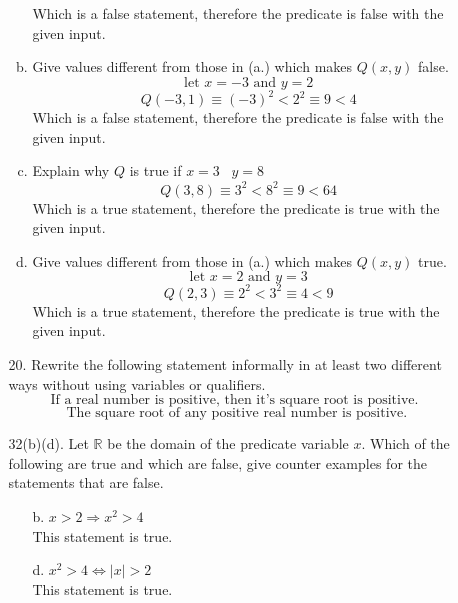 \documentclass[12pt]{article}
\newcommand{\R}{\mathbb{R}}
\newcommand{\paren}[1]{\left( #1 \right)}
\newcommand{\abso}[1]{\left|#1 \right|}
\begin{document}
\begin{enumerate}
\begin{enumerate}
\begin{enumerate}[a.]
                            Which is a false statement, therefore the predicate is false with the given input. 
                        \item Give values different from those in (a.) which makes $Q(x,y)$ false.
                            \[
                            \text{let $x=-3$ and $y=2$}
                            \]
                            \[
                            Q(-3,1) \equiv \paren{-3}^2 < 2^2 \equiv 9 < 4
                            \]
                            Which is a false statement, therefore the predicate is false with the given input. 
                        \item Explain why $Q$ is true if $x=3 \;\;\; y=8$
                            \[
                            Q(3,8) \equiv 3^2 < 8^2 \equiv 9 < 64
                            \]
                            Which is a true statement, therefore the predicate is true with the given input.
                        \item Give values different from those in (a.) which makes $Q(x,y)$ true. 
                            \[
                            \text{let $x=2$ and $y=3$}
                            \]
                            \[
                            Q(2,3) \equiv 2^2 < 3^2 \equiv 4 < 9
                            \]
                            Which is a true statement, therefore the predicate is true with the given input.
                    \end{enumerate}
                \item[20.]Rewrite the following statement informally in at least two different ways without using variables or qualifiers.
                \[
                \text{If a real number is positive, then it's square root is positive. }
                \]
                \[
                \text{The square root of any positive real number is positive.}
                \]
                \item[32(b)(d).] Let $\R$ be the domain of the predicate variable $x$. Which of the following are true and which are false, give counter examples for the statements that are false. 
                    \begin{enumerate}
                        \item[b.] $x>2 \Rightarrow x^2 > 4$\\
                        This statement is true.
                        \item[d.] $x^2 > 4 \iff \abso{x} >2$\\
                        This statement is true.
                        

\end{enumerate}
\end{enumerate}
\end{enumerate}
\end{document}
